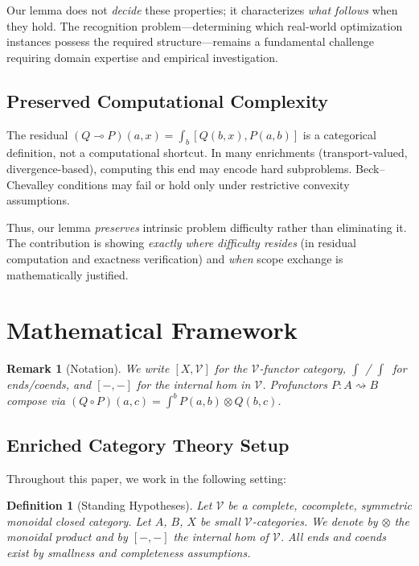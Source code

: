 \documentclass[11pt]{article}
\numberwithin{equation}{section}
\theoremstyle{upright}
\newtheorem{definition}{Definition}
\newtheorem{remark}{Remark}
\newcommand{\V}{\mathcal{V}}
\newcommand{\profto}{\rightsquigarrow}
\begin{document}
Our lemma does not \emph{decide} these properties; it characterizes \emph{what follows} when they hold. The recognition problem—determining which real-world optimization instances possess the required structure—remains a fundamental challenge requiring domain expertise and empirical investigation.

\subsection{Preserved Computational Complexity}

The residual $(Q \multimap P)(a,x) = \int_b [Q(b,x), P(a,b)]$ is a categorical definition, not a computational shortcut. In many enrichments (transport-valued, divergence-based), computing this end may encode hard subproblems. Beck--Chevalley conditions may fail or hold only under restrictive convexity assumptions.

Thus, our lemma \emph{preserves} intrinsic problem difficulty rather than eliminating it. The contribution is showing \emph{exactly where difficulty resides} (in residual computation and exactness verification) and \emph{when} scope exchange is mathematically justified.

\section{Mathematical Framework}\label{sec:math-framework}

\begin{remark}[Notation]
We write $[X,\V]$ for the $\V$-functor category, $\int$ / $\int^{\ }$ for ends/coends,
and $[{-},{-}]$ for the internal hom in $\V$. Profunctors $P:A\profto B$ compose
via $(Q\circ P)(a,c)=\int^{b} P(a,b)\otimes Q(b,c)$.
\end{remark}

\subsection{Enriched Category Theory Setup}

Throughout this paper, we work in the following setting:

\begin{definition}[Standing Hypotheses]
Let $\V$ be a \emph{complete, cocomplete, symmetric monoidal closed} category. Let $A$, $B$, $X$ be \emph{small} $\V$-categories. We denote by $\otimes$ the monoidal product and by $[{-},{-}]$ the internal hom of $\V$. All ends and coends exist by smallness and completeness assumptions.
\end{definition}
\end{document}
